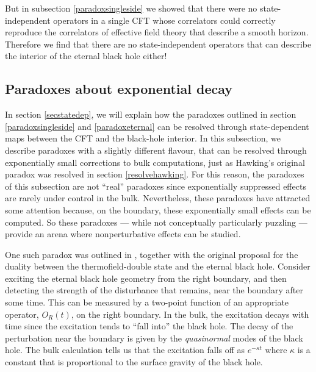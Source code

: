 \documentclass[12pt]{article}
\begin{document}
But in subsection \ref{paradoxsingleside} we showed that there were no state-independent operators in a single CFT whose correlators could correctly reproduce the correlators of effective field theory that describe a smooth horizon.  Therefore we find that there are no state-independent operators that can describe the interior of the eternal black hole either!






\subsection{Paradoxes about exponential decay \label{paradoxexponential}}

In section \ref{secstatedep}, we will explain how the paradoxes outlined in section \ref{paradoxsingleside} and \ref{paradoxeternal} can be resolved through state-dependent maps between the CFT and the black-hole interior. In this subsection, we describe paradoxes with a slightly different flavour, that can be resolved through exponentially small corrections to bulk computations, just as Hawking's original paradox was resolved in section \ref{resolvehawking}. For this reason, the paradoxes of this subsection  are not ``real'' paradoxes since exponentially suppressed effects are rarely under control in the bulk. Nevertheless, these paradoxes have attracted some attention because, on the boundary, 
these exponentially small effects can be computed. So these paradoxes --- while not conceptually particularly puzzling --- provide an arena where nonperturbative effects can be studied. 

One such paradox was outlined in \cite{Maldacena:2001kr}, together with the original proposal for the duality between the thermofield-double state and the eternal black hole. Consider exciting the eternal black hole geometry from the right boundary, and then detecting the strength of the disturbance that remains, near the boundary  after some time. This can be measured by a two-point function of an appropriate operator, $O_R(t)$, on the right boundary.   In the bulk, the excitation decays with time since the excitation tends to ``fall into'' the black hole. The decay of the perturbation near the boundary is given by the {\em quasinormal} modes \cite{Berti:2009kk,Kokkotas:1999bd,Horowitz:1999jd} of the black hole.  The bulk calculation tells us that the excitation falls off as $e^{-\kappa t}$ where $\kappa$ is a constant that is proportional to the surface gravity of the black hole. 
\end{document}
